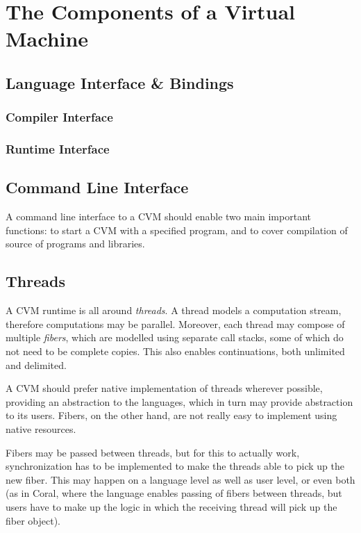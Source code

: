 \chapter{The Components of a Virtual Machine}

\section{Language Interface \& Bindings}
\label{sec:language-bindings}

\subsection{Compiler Interface}

\subsection{Runtime Interface}

\section{Command Line Interface}

A command line interface to a CVM should enable two main important functions: to start a CVM with a specified program, and to cover compilation of source of programs and libraries. 






\section{Threads}

A CVM runtime is all around {\em threads}. A thread models a computation stream, therefore computations may be parallel. Moreover, each thread may compose of multiple {\em fibers}, which are modelled using separate call stacks, some of which do not need to be complete copies. This also enables continuations, both unlimited and delimited. 

A CVM should prefer native implementation of threads wherever possible, providing an abstraction to the languages, which in turn may provide abstraction to its users. Fibers, on the other hand, are not really easy to implement using native resources. 

Fibers may be passed between threads, but for this to actually work, synchronization has to be implemented to make the threads able to pick up the new fiber. This may happen on a language level as well as user level, or even both (as in Coral, where the language enables passing of fibers between threads, but users have to make up the logic in which the receiving thread will pick up the fiber object). 





